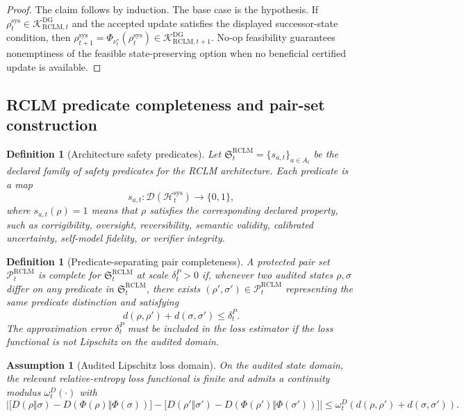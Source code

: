 \documentclass[11pt,a4paper]{article}
\newtheorem{definition}[theorem]{Definition}
\newtheorem{assumption}[theorem]{Assumption}
\newcommand{\D}{\mathcal D}
\newcommand{\Hcal}{\mathcal H}
\newcommand{\Pcal}{\mathcal P}
\newcommand{\Kcal}{\mathcal K}
\newcommand{\RCLM}{\mathrm{RCLM}}
\newcommand{\DG}{\mathrm{DG}}
\newcommand{\sys}{\mathrm{sys}}
\begin{document}
\begin{proof}
The claim follows by induction. The base case is the hypothesis. If \(\rho_t^{\sys}\in\Kcal_{\RCLM,t}^{\DG}\) and the accepted update satisfies the displayed successor-state condition, then \(\rho_{t+1}^{\sys}=\Phi_{\nu_t^*}(\rho_t^{\sys})\in\Kcal_{\RCLM,t+1}^{\DG}\). No-op feasibility guarantees nonemptiness of the feasible state-preserving option when no beneficial certified update is available.
\end{proof}

\subsection{RCLM predicate completeness and pair-set construction}

\begin{definition}[Architecture safety predicates]
Let \(\mathfrak S_t^{\RCLM}=\{s_{a,t}\}_{a\in A_t}\) be the declared family of safety predicates for the RCLM architecture. Each predicate is a map
\[
s_{a,t}:\D(\Hcal_t^{\sys})\to\{0,1\},
\]
where \(s_{a,t}(\rho)=1\) means that \(\rho\) satisfies the corresponding declared property, such as corrigibility, oversight, reversibility, semantic validity, calibrated uncertainty, self-model fidelity, or verifier integrity.
\end{definition}

\begin{definition}[Predicate-separating pair completeness]
A protected pair set \(\Pcal_t^{\RCLM}\) is complete for \(\mathfrak S_t^{\RCLM}\) at scale \(\delta_t^{P}>0\) if, whenever two audited states \(\rho,\sigma\) differ on any predicate in \(\mathfrak S_t^{\RCLM}\), there exists \((\rho',\sigma')\in\Pcal_t^{\RCLM}\) representing the same predicate distinction and satisfying
\[
d(\rho,\rho')+d(\sigma,\sigma')\le\delta_t^P.
\]
The approximation error \(\delta_t^P\) must be included in the loss estimator if the loss functional is not Lipschitz on the audited domain.
\end{definition}

\begin{assumption}[Audited Lipschitz loss domain]
On the audited state domain, the relevant relative-entropy loss functional is finite and admits a continuity modulus \(\omega_t^D(\cdot)\) with
\[
\left|
\bigl[D(\rho\Vert\sigma)-D(\Phi(\rho)\Vert\Phi(\sigma))\bigr]
-
\bigl[D(\rho'\Vert\sigma')-D(\Phi(\rho')\Vert\Phi(\sigma'))\bigr]
\right|
\le \omega_t^D(d(\rho,\rho')+d(\sigma,\sigma')).
\]
\end{assumption}
\end{document}
